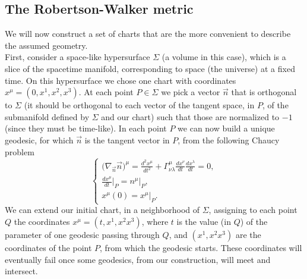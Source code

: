 \subsection{The Robertson-Walker metric}
We will now construct a set of charts that are the more convenient to describe the assumed geometry.\\
First, consider a space-like hypersurface $\Sigma$ (a volume in this case), which is a slice of the spacetime manifold, corresponding to space (the universe) at a fixed time. On this hypersurface we chose one chart with coordinates $x^\mu=(0,x^1,x^2,x^3)$. At each point $P\in\Sigma$ we pick a vector $\vec n$ that is orthogonal to $\Sigma$ (it should be orthogonal to each vector of the tangent space, in $P$, of the submanifold defined by $\Sigma$ and our chart) such that those are normalized to $-1$ (since they must be time-like). In each point $P$ we can now build a unique geodesic, for which $\vec n$ is the tangent vector in $P$, from the following Chaucy problem
\begin{equation}\label{Chaucy problem}
    \begin{cases}
        \big(\nabla_{\vec n}\vec n\big)^\mu=\frac{d^2x^\mu}{dt^2}+\Gamma_{\nu\lambda}^{\mu}\frac{dx^\nu}{dt}\frac{dx^\lambda}{dt}=0,\\\frac{dx^\mu}{dt}\big|_{P}=n^\mu\big|_P,\\x^\mu(0)=x^\mu\big|_P.
    \end{cases}
\end{equation}
We can extend our initial chart, in a neighborhood of $\Sigma$, assigning to each point $Q$ the coordinates $x^\mu=(t,x^1,x^2x^3)$, where $t$ is the value (in $Q$) of the parameter of one geodesic passing through $Q$, and $(x^1,x^2x^3)$ are the coordinates of the point $P$, from which the geodesic starts. These coordinates will eventually fail once some geodesics, from our construction, will meet and intersect.\\

